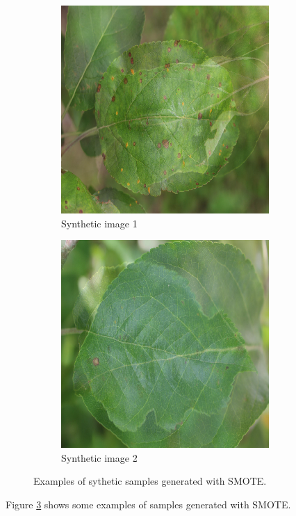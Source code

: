 \documentclass[10pt,twocolumn,letterpaper]{article}
\begin{document}
\begin{figure}[htb]
\begin{center}
\begin{subfigure}[b]{0.49\linewidth}
\centering
\includegraphics[width=\linewidth]{images/smote_1.png}
\caption{Synthetic image 1}\label{synth1}
\end{subfigure}
\begin{subfigure}[b]{0.49\linewidth}
\centering
\includegraphics[width=\linewidth]{images/smote_2.png}
\caption{Synthetic image 2}\label{snthy2}
\end{subfigure}\hfill
\end{center}
   \caption{Examples of sythetic samples generated with SMOTE.}
\label{smote}
\end{figure}
Figure \ref{smote} shows some examples of samples generated with SMOTE. 
\end{document}
